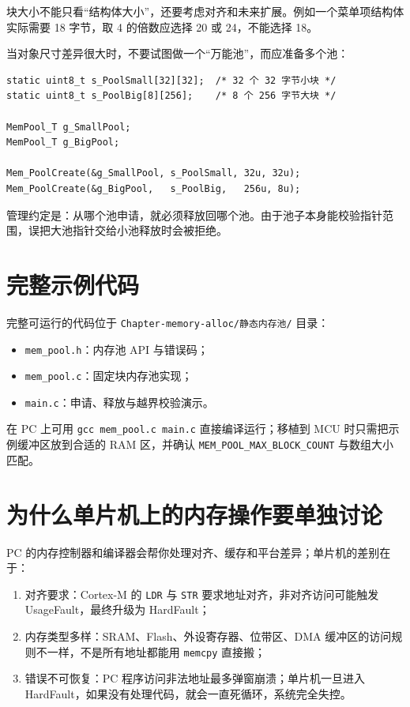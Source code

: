 块大小不能只看“结构体大小”，还要考虑对齐和未来扩展。例如一个菜单项结构体实际需要 18 字节，取 4 的倍数应选择 20 或 24，不能选择 18。

当对象尺寸差异很大时，不要试图做一个“万能池”，而应准备多个池：

\begin{lstlisting}[style=c]
static uint8_t s_PoolSmall[32][32];  /* 32 个 32 字节小块 */
static uint8_t s_PoolBig[8][256];    /* 8 个 256 字节大块 */

MemPool_T g_SmallPool;
MemPool_T g_BigPool;

Mem_PoolCreate(&g_SmallPool, s_PoolSmall, 32u, 32u);
Mem_PoolCreate(&g_BigPool,   s_PoolBig,   256u, 8u);
\end{lstlisting}

管理约定是：从哪个池申请，就必须释放回哪个池。由于池子本身能校验指针范围，误把大池指针交给小池释放时会被拒绝。

\section{完整示例代码}

完整可运行的代码位于 \texttt{Chapter-memory-alloc/静态内存池/} 目录：

\begin{itemize}
\item \texttt{mem\_pool.h}：内存池 API 与错误码；
\item \texttt{mem\_pool.c}：固定块内存池实现；
\item \texttt{main.c}：申请、释放与越界校验演示。
\end{itemize}

在 PC 上可用 \texttt{gcc mem\_pool.c main.c} 直接编译运行；移植到 MCU 时只需把示例缓冲区放到合适的 RAM 区，并确认 \texttt{MEM\_POOL\_MAX\_BLOCK\_COUNT} 与数组大小匹配。

\section{为什么单片机上的内存操作要单独讨论}

PC 的内存控制器和编译器会帮你处理对齐、缓存和平台差异；单片机的差别在于：

\begin{enumerate}
\item 对齐要求：Cortex-M 的 \texttt{LDR} 与 \texttt{STR} 要求地址对齐，非对齐访问可能触发 UsageFault，最终升级为 HardFault；
\item 内存类型多样：SRAM、Flash、外设寄存器、位带区、DMA 缓冲区的访问规则不一样，不是所有地址都能用 \texttt{memcpy} 直接搬；
\item 错误不可恢复：PC 程序访问非法地址最多弹窗崩溃；单片机一旦进入 HardFault，如果没有处理代码，就会一直死循环，系统完全失控。
\end{enumerate}


